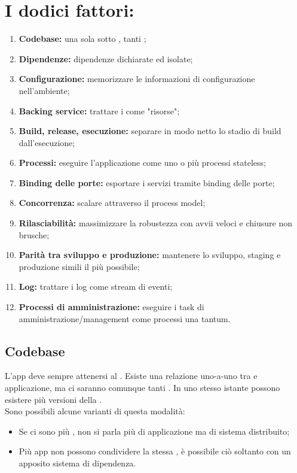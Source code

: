 \documentclass[NormeDiProgetto.tex]{subfiles}
\begin{document}
\section{I dodici fattori:}
\begin{enumerate}
\item \textbf{Codebase:} una sola  sotto , tanti ;
\item \textbf{Dipendenze:} dipendenze dichiarate ed isolate;
\item \textbf{Configurazione:} memorizzare le informazioni di configurazione nell'ambiente;
\item \textbf{Backing service:} trattare i  come "risorse";
\item \textbf{Build, release, esecuzione:} separare in modo netto lo stadio di build dall'esecuzione;
\item \textbf{Processi:} eseguire l'applicazione come uno o più processi stateless;
\item \textbf{Binding delle porte:} esportare i servizi tramite binding delle porte;
\item \textbf{Concorrenza:} scalare attraverso il process model;
\item \textbf{Rilasciabilità:} massimizzare la robustezza con avvii veloci e chiusure non brusche;
\item \textbf{Parità tra sviluppo e produzione:} mantenere lo sviluppo, staging e produzione simili il più possibile;
\item \textbf{Log:} trattare i log come stream di eventi;
\item \textbf{Processi di amministrazione:} eseguire i task di amministrazione/management come processi una tantum.
\end{enumerate}

\subsection{Codebase}
L'app deve sempre attenersi al . Esiste una relazione uno-a-uno tra  e applicazione, ma ci saranno comunque tanti . In uno stesso istante possono esistere più versioni della .\\
Sono possibili alcune varianti di questa modalità:
\begin{itemize}
\item Se ci sono più , non si parla più di applicazione ma di sistema distribuito;
\item Più app non possono condividere la stessa , è possibile ciò soltanto con un apposito sistema di dipendenza.
\end{itemize}
\end{document}
